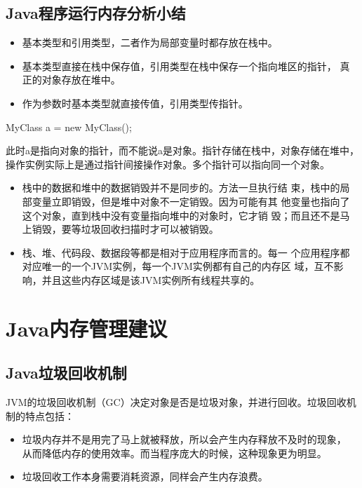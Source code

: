 \subsection{Java程序运行内存分析小结}

\begin{itemize}
\item 基本类型和引用类型，二者作为局部变量时都存放在栈中。
\item 基本类型直接在栈中保存值，引用类型在栈中保存一个指向堆区的指针，
  真正的对象存放在堆中。
\item 作为参数时基本类型就直接传值，引用类型传指针。
\end{itemize}


\begin{javaCode}
  MyClass a = new MyClass();
\end{javaCode}

此时a是指向对象的指针，而不能说a是对象。指针存储在栈中，对象存储在堆中，
操作实例实际上是通过指针间接操作对象。多个指针可以指向同一个对象。

\begin{itemize}
\item {\hei\Red 栈中的数据和堆中的数据销毁并不是同步的。}方法一旦执行结
    束，栈中的局部变量立即销毁，但是堆中对象不一定销毁。因为可能有其
    他变量也指向了这个对象，直到栈中没有变量指向堆中的对象时，它才销
    毁；而且还不是马上销毁，要等垃圾回收扫描时才可以被销毁。
\item {\hei\Red 栈、堆、代码段、数据段等都是相对于应用程序而言的。}每一
    个应用程序都对应唯一的一个JVM实例，每一个JVM实例都有自己的内存区
    域，互不影响，并且这些内存区域是该JVM实例所有线程共享的。
\end{itemize}

\section{Java内存管理建议}

\subsection{Java垃圾回收机制} 

{\hei\Blue JVM的垃圾回收机制（GC）决定对象是否是垃圾对象，并进行回收。}垃圾回收机制的特点包括：

\begin{itemize}
\item 垃圾内存并不是用完了马上就被释放，所以会产生内存释放不及时的现象，
  从而降低内存的使用效率。而当程序庞大的时候，这种现象更为明显。
\item 垃圾回收工作本身需要消耗资源，同样会产生内存浪费。
\end{itemize}

